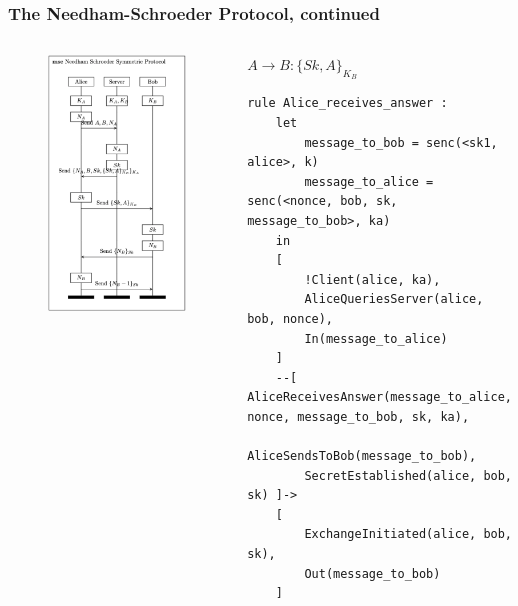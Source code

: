 \documentclass[aspectratio=169,t,xcolor=table]{beamer}
\begin{document}
\begin{frame}[fragile]
    \frametitle{The Needham-Schroeder Protocol, continued}
    \begin{columns}
        \begin{figure}
            \centering
            \includegraphics[width=.8\textwidth]{images/NS.png}
        \end{figure}
        \begin{block}{$A \to B: \{Sk, A\}_{K_B}$}
            \begin{lstlisting}[language=Tamarin]
rule Alice_receives_answer :
    let
        message_to_bob = senc(<sk1, alice>, k)
        message_to_alice = senc(<nonce, bob, sk, message_to_bob>, ka)
    in
    [
        !Client(alice, ka),
        AliceQueriesServer(alice, bob, nonce),
        In(message_to_alice)
    ]
    --[ AliceReceivesAnswer(message_to_alice, nonce, message_to_bob, sk, ka),
        AliceSendsToBob(message_to_bob),
        SecretEstablished(alice, bob, sk) ]->
    [
        ExchangeInitiated(alice, bob, sk),
        Out(message_to_bob)
    ]\end{lstlisting}
        \end{block}
    \end{columns}
\end{frame}
\end{document}
